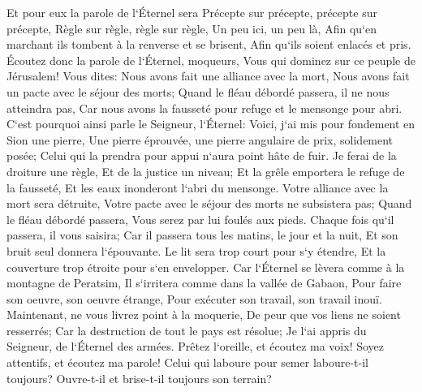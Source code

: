 \verse Et pour eux la parole de l`Éternel sera Précepte sur précepte, précepte sur précepte, Règle sur règle, règle sur règle, Un peu ici, un peu là, Afin qu`en marchant ils tombent à la renverse et se brisent, Afin qu`ils soient enlacés et pris. 
\verse Écoutez donc la parole de l`Éternel, moqueurs, Vous qui dominez sur ce peuple de Jérusalem! 
\verse Vous dites: Nous avons fait une alliance avec la mort, Nous avons fait un pacte avec le séjour des morts; Quand le fléau débordé passera, il ne nous atteindra pas, Car nous avons la fausseté pour refuge et le mensonge pour abri. 
\verse C`est pourquoi ainsi parle le Seigneur, l`Éternel: Voici, j`ai mis pour fondement en Sion une pierre, Une pierre éprouvée, une pierre angulaire de prix, solidement posée; Celui qui la prendra pour appui n`aura point hâte de fuir. 
\verse Je ferai de la droiture une règle, Et de la justice un niveau; Et la grêle emportera le refuge de la fausseté, Et les eaux inonderont l`abri du mensonge. 
\verse Votre alliance avec la mort sera détruite, Votre pacte avec le séjour des morts ne subsistera pas; Quand le fléau débordé passera, Vous serez par lui foulés aux pieds. 
\verse Chaque fois qu`il passera, il vous saisira; Car il passera tous les matins, le jour et la nuit, Et son bruit seul donnera l`épouvante. 
\verse Le lit sera trop court pour s`y étendre, Et la couverture trop étroite pour s`en envelopper. 
\verse Car l`Éternel se lèvera comme à la montagne de Peratsim, Il s`irritera comme dans la vallée de Gabaon, Pour faire son oeuvre, son oeuvre étrange, Pour exécuter son travail, son travail inouï. 
\verse Maintenant, ne vous livrez point à la moquerie, De peur que vos liens ne soient resserrés; Car la destruction de tout le pays est résolue; Je l`ai appris du Seigneur, de l`Éternel des armées. 
\verse Prêtez l`oreille, et écoutez ma voix! Soyez attentifs, et écoutez ma parole! 
\verse Celui qui laboure pour semer laboure-t-il toujours? Ouvre-t-il et brise-t-il toujours son terrain? 
